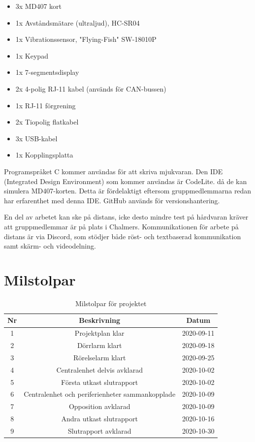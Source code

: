\documentclass[a4paper]{article}
\begin{document}
\begin{itemize}
    \item 3x MD407 kort
    \item 1x Avståndsmätare (ultraljud), HC-SR04
    \item 1x Vibrationssensor, "Flying-Fish" SW-18010P
    \item 1x Keypad
    \item 1x 7-segmentsdisplay
    \item 2x 4-polig RJ-11 kabel (används för CAN-bussen)
    \item 1x RJ-11 förgrening
    \item 2x Tiopolig flatkabel
    \item 3x USB-kabel
    \item 1x Kopplingsplatta
\end{itemize}

Programspråket C kommer användas för att skriva mjukvaran. Den IDE (Integrated Design Environment) som kommer användas är CodeLite. då de kan simulera MD407-korten. Detta är fördelaktigt eftersom gruppmedlemmarna redan har erfarenthet med denna IDE. GitHub används för versionshantering.

En del av arbetet kan ske på distans, icke desto mindre test på hårdvaran kräver att gruppmedlemmar är på plats i Chalmers. Kommunikationen för arbete på distans är via Discord, som stödjer både röst- och textbaserad kommunikation samt skärm- och videodelning.

\section{Milstolpar}


\begin{table}[H]
    \centering
        \begin{tabular}{ |c|c|c| }\hline
            Nr & Beskrivning & Datum \\\hline\hline
            1 & Projektplan klar & 2020-09-11 \\\hline
            2 & Dörrlarm klart & 2020-09-18 \\\hline
            3 & Rörelselarm klart & 2020-09-25 \\\hline
            4 & Centralenhet delvis avklarad & 2020-10-02 \\\hline
            5 & Första utkast slutrapport & 2020-10-02 \\\hline
            6 & Centralenhet och periferienheter sammankopplade & 2020-10-09 \\\hline
            7 & Opposition avklarad & 2020-10-09 \\\hline
            8 & Andra utkast slutrapport & 2020-10-16 \\\hline
            9 & Slutrapport avklarad & 2020-10-30 \\\hline
        \end{tabular}
        \caption{Milstolpar för projektet}
        \label{table:milstolpar}
\end{table}
\end{document}
